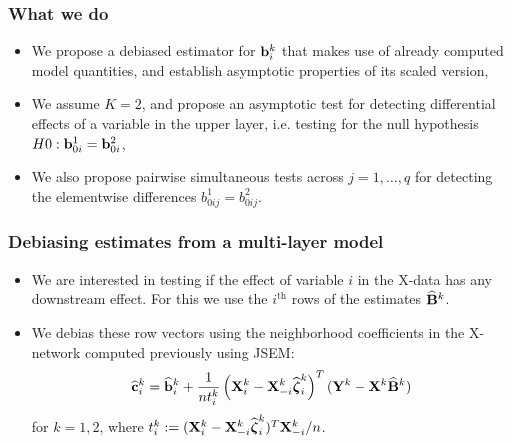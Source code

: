 \documentclass[10pt]{beamer}
\theoremstyle{definition}
\begin{document}
\begin{frame}
\frametitle{What we do}
\begin{itemize}
\item  We propose a {\colb debiased estimator} for ${\bf{b}}_i^k$ that makes use of already computed model quantities, and establish asymptotic properties of its scaled version,

\vspace{1em}
\item We assume $K = 2$, and propose an {\colb asymptotic test} for detecting differential effects of a variable in the upper layer, i.e. testing for the null hypothesis $H0 : {\bf{b}}^1_{0i} = {\bf{b}}^2_{0i}$,

\vspace{1em}
\item We also propose {\colb pairwise simultaneous tests} across $j = 1, \ldots, q$ for detecting the elementwise differences $b_{0ij}^1 = b_{0ij}^2$.
\end{itemize}

\end{frame}
\begin{frame}
\frametitle{Debiasing estimates from a multi-layer model}

\begin{itemize}
\item We are interested in testing if the effect of variable $i$ in the X-data has any downstream effect. For this we use the $i^{\text{th}}$ rows of the estimates $\widehat {{\mathbf{B}}}^k$.
\vspace{1em}

\item We debias these row vectors using the neighborhood coefficients in the X-network computed previously using JSEM:
%
\begin{align*}
\widehat {{\bf{c}}}_i^k = \widehat {{\bf{b}}}_i^k + \frac{1}{n t_i^k} \left( {\mathbf{X}}_i^k - {\mathbf{X}}_{-i}^k \widehat {{\boldsymbol{\zeta}}}_i^k \right)^T
({\mathbf{Y}}^k - {\mathbf{X}}^k \widehat {{\mathbf{B}}}^k )
\end{align*}
%
for $k = 1,2$, where $t_i^k := ( {\mathbf{X}}_i^k - {\mathbf{X}}_{-i}^k \widehat {{\boldsymbol{\zeta}}}_i^k )^T {\mathbf{X}}_{-i}^k/n$.
\end{itemize}

\end{frame}
\end{document}
